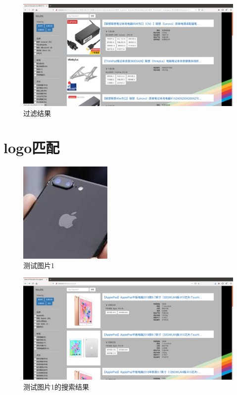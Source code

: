 \begin{figure}[htbp]
\centering
\includegraphics[width=13.5cm]{img/zlt/filter1_result.png}
\caption{过滤结果}
\label{fig:zlt_filter1_result}
\end{figure}

\section{logo匹配}

\begin{figure}[htbp]
\centering
\includegraphics[width=4.5cm]{img/zlt/test1.jpg}
\caption{测试图片1}
\label{fig:zlt_test1}
\end{figure}

\begin{figure}[htbp]
\centering
\includegraphics[width=14.5cm]{img/zlt/pictmatch1_1.png}
\caption{测试图片1的搜索结果}
\label{fig:zlt_pictmatch1}
\end{figure}

